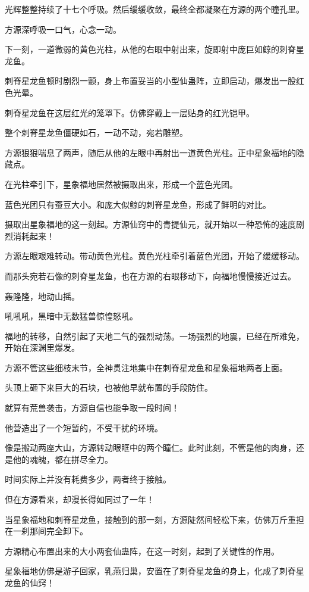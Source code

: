 \begin{this_body}
光辉整整持续了十七个呼吸。然后缓缓收敛，最终全都凝聚在方源的两个瞳孔里。

方源深呼吸一口气，心念一动。

下一刻，一道微弱的黄色光柱，从他的右眼中射出来，旋即射中庞巨如鲸的刺脊星龙鱼。

刺脊星龙鱼顿时剧烈一颤，身上布置妥当的小型仙蛊阵，立即启动，爆发出一股红色光晕。

刺脊星龙鱼在这层红光的笼罩下。仿佛穿戴上一层贴身的红光铠甲。

整个刺脊星龙鱼僵硬如石，一动不动，宛若雕塑。

方源狠狠喘息了两声，随后从他的左眼中再射出一道黄色光柱。正中星象福地的隐藏点。

在光柱牵引下，星象福地居然被摄取出来，形成一个蓝色光团。

蓝色光团只有蚕豆大小。和庞大似鲸的刺脊星龙鱼，形成了鲜明的对比。

摄取出星象福地的这一刻起。方源仙窍中的青提仙元，就开始以一种恐怖的速度剧烈消耗起来！

方源左眼艰难转动。带动黄色光柱。黄色光柱牵引着蓝色光团，开始了缓缓移动。

而那头宛若石像的刺脊星龙鱼，也在方源的右眼移动下，向福地慢慢接近过去。

轰隆隆，地动山摇。

吼吼吼，黑暗中无数猛兽惊惶怒吼。

福地的转移，自然引起了天地二气的强烈动荡。一场强烈的地震，已经在所难免，开始在深渊里爆发。

方源不管这些细枝末节，全神贯注地集中在刺脊星龙鱼和星象福地两者上面。

头顶上砸下来巨大的石块，也被他早就布置的手段防住。

就算有荒兽袭击，方源自信也能争取一段时间！

他营造出了一个短暂的，不受干扰的环境。

像是搬动两座大山，方源转动眼眶中的两个瞳仁。此时此刻，不管是他的肉身，还是他的魂魄，都在拼尽全力。

时间实际上并没有耗费多少，两者终于接触。

但在方源看来，却漫长得如同过了一年！

当星象福地和刺脊星龙鱼，接触到的那一刻，方源陡然间轻松下来，仿佛万斤重担在一刹那间完全卸下。

方源精心布置出来的大小两套仙蛊阵，在这一时刻，起到了关键性的作用。

星象福地仿佛是游子回家，乳燕归巢，安置在了刺脊星龙鱼的身上，化成了刺脊星龙鱼的仙窍！


\end{this_body}
